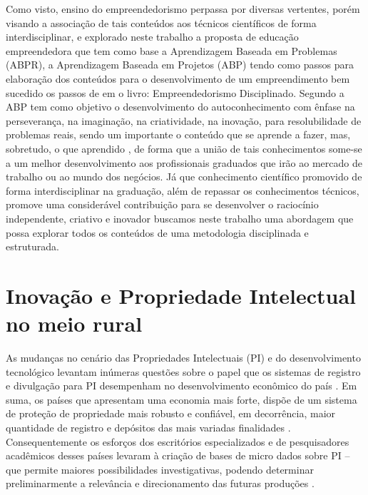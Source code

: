 \newpage


Como visto, ensino do empreendedorismo perpassa por diversas vertentes, porém visando a associação de tais conteúdos aos técnicos científicos de forma interdisciplinar, e explorado neste trabalho a proposta de educação empreendedora que tem como base a Aprendizagem Baseada em Problemas (ABPR), a Aprendizagem Baseada em Projetos (ABP) \cite{bender_aprendizagem_2015} tendo como passos para elaboração dos conteúdos para o desenvolvimento de um empreendimento bem sucedido os passos de \cite{aulet_empreendedorismo_2019} em o livro: Empreendedorismo Disciplinado. Segundo \cite{bender_aprendizagem_2015} a ABP tem como objetivo o desenvolvimento do autoconhecimento com ênfase na perseverança, na imaginação, na criatividade, na inovação, para resolubilidade de problemas reais, sendo um importante o conteúdo que se aprende a fazer, mas, sobretudo, o que aprendido \cite{souza_disseminacao_2001}, de forma que a união de tais conhecimentos some-se a um melhor desenvolvimento aos profissionais graduados que irão ao mercado de trabalho ou ao mundo dos negócios. Já que conhecimento científico promovido de forma interdisciplinar na graduação, além de repassar os conhecimentos técnicos, promove  uma considerável contribuição para se desenvolver o raciocínio independente, criativo e inovador buscamos neste trabalho uma abordagem que possa explorar todos os conteúdos de uma metodologia disciplinada e estruturada.


\section{Inovação e Propriedade Intelectual no meio rural}

As mudanças no cenário das Propriedades Intelectuais (PI) e do desenvolvimento tecnológico levantam inúmeras questões sobre o papel que os sistemas de registro e divulgação para PI desempenham no desenvolvimento econômico do país \cite{segala_os_2016}. Em suma, os países que apresentam uma economia mais forte, dispõe de um sistema de proteção de propriedade mais robusto e confiável, em decorrência, maior quantidade de registro e depósitos das mais variadas finalidades \cite{mueller_universidades_2014}. Consequentemente os esforços dos escritórios especializados e de pesquisadores acadêmicos desses países levaram à criação de bases de micro dados sobre PI – que permite maiores possibilidades investigativas, podendo determinar preliminarmente a relevância e direcionamento das futuras produções \cite{luna_impacto_2006}. 







